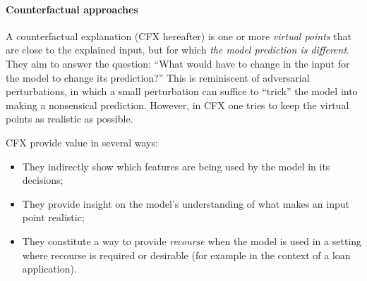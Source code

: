\documentclass[../main.tex]{subfiles}
\begin{document}

\paragraph{Counterfactual approaches}
A counterfactual explanation (CFX hereafter) is one or more \emph{virtual points} that are close to the explained input, but for which \emph{the model prediction is different}.
They aim to answer the question: ``What would have to change in the input for the model to change its prediction?''
This is reminiscent of adversarial perturbations, in which a small perturbation can suffice to ``trick'' the model into making a nonsensical prediction.
However, in CFX one tries to keep the virtual points as realistic as possible.

CFX provide value in several ways:
\begin{itemize}
    \item They indirectly show which features are being used by the model in its decisions;
    \item They provide insight on the model's understanding of what makes an input point realistic;
    \item They constitute a way to provide \emph{recourse} when the model is used in a setting where recourse is required or desirable (for example in the context of a loan application).
\end{itemize}

\cite{wachterCounterfactual2017}
\end{document}

